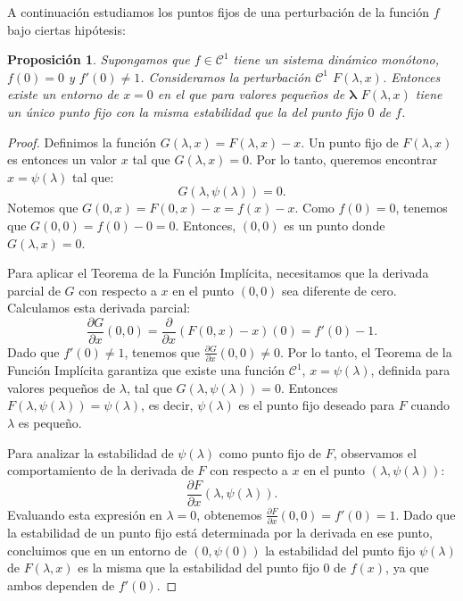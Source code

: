 \documentclass[12pt,a4paper]{report}
\newtheorem{proposicion}{Proposición}[section]
\theoremstyle{definition}
\begin{document}
A continuación estudiamos los puntos fijos de una perturbación de la función $f$ bajo ciertas hipótesis:

\begin{proposicion}
    
Supongamos que $f \in \mathcal{C}^1$ tiene un sistema dinámico monótono, $f(0)=0$ y $f'(0) \neq 1$. Consideramos la perturbación $\mathcal{C}^1$ $F(\lambda,x)$.
Entonces existe un entorno de $x = 0$ en el que para valores pequeños de $\mathbf{\lambda}$ $F(\lambda,x)$ tiene un único punto fijo con la misma estabilidad que la del punto fijo $0$ de $f$.

\end{proposicion}

\begin{proof}

Definimos la función \( G(\lambda, x) = F(\lambda, x) - x \). Un punto fijo de \( F(\lambda, x) \) es entonces un valor \( x \) tal que \( G(\lambda, x) = 0 \). Por lo tanto, queremos encontrar \( x = \psi(\lambda) \) tal que:
\[
G(\lambda, \psi(\lambda)) = 0.
\]
Notemos que \( G(0, x) = F(0, x) - x = f(x) - x \). Como \( f(0) = 0 \), tenemos que \( G(0, 0) = f(0) - 0 = 0 \). Entonces, \( (0, 0) \) es un punto donde \( G(\lambda, x) = 0 \).

Para aplicar el Teorema de la Función Implícita, necesitamos que la derivada parcial de \( G \) con respecto a \( x \) en el punto \( (0, 0) \) sea diferente de cero. Calculamos esta derivada parcial:
\[
\frac{\partial G}{\partial x} (0, 0) = \frac{\partial}{\partial x} \left( F(0, x) - x \right)(0)  = f'(0) - 1.
\]
Dado que \( f'(0) \neq 1 \), tenemos que \( \frac{\partial G}{\partial x} (0, 0) \neq 0 \). Por lo tanto, el Teorema de la Función Implícita garantiza que existe una función \( \mathcal{C}^1 \), \( x = \psi(\lambda) \), definida para valores pequeños de \( \lambda \), tal que \( G(\lambda, \psi(\lambda)) = 0 \). Entonces \( F(\lambda, \psi(\lambda)) = \psi(\lambda) \), es decir, \( \psi(\lambda) \) es el punto fijo deseado para \( F \) cuando \( \lambda \) es pequeño.

Para analizar la estabilidad de \( \psi(\lambda) \) como punto fijo de \( F \), observamos el comportamiento de la derivada de \( F \) con respecto a \( x \) en el punto \( (\lambda, \psi(\lambda)) \):
\[
\frac{\partial F}{\partial x} (\lambda, \psi(\lambda)).
\]
Evaluando esta expresión en \( \lambda = 0 \), obtenemos \( \frac{\partial F}{\partial x}(0, 0) = f'(0) = 1 \). Dado que la estabilidad de un punto fijo está determinada por la derivada en ese punto, concluimos que en un entorno de $(0,\psi(0))$ la estabilidad del punto fijo \( \psi(\lambda) \) de \( F(\lambda, x) \) es la misma que la estabilidad del punto fijo \( 0 \) de \( f(x) \), ya que ambos dependen de \( f'(0) \).

\end{proof}
\end{document}
